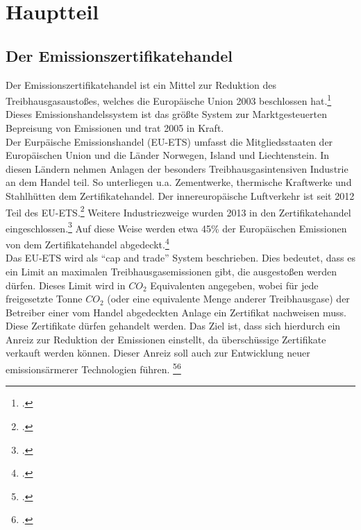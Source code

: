 \chapter{Hauptteil}
\section{Der Emissionszertifikatehandel}
Der Emissionszertifikatehandel ist ein Mittel zur Reduktion des Treibhausgasaustoßes, welches die Europäische Union 2003 beschlossen hat.\footcite[Vgl. auch im Folgenden][]{Buchner2007}
Dieses Emissionshandelssystem ist das größte System zur Marktgesteuerten Bepreisung von Emissionen und trat 2005 in Kraft.\\
Der Eurpäische Emissionshandel (EU-ETS) umfasst die Mitgliedsstaaten der Europäischen Union und die Länder Norwegen, Island und Liechtenstein.
In diesen Ländern nehmen Anlagen der besonders Treibhausgasintensiven Industrie an dem Handel teil.
So unterliegen u.a. Zementwerke, thermische Kraftwerke und Stahlhütten dem Zertifikatehandel. Der innereuropäische Luftverkehr ist seit 2012 Teil des EU-ETS.\footcite[Vgl.][]{Umweltbundesamt}
Weitere Industriezweige wurden 2013 in den Zertifikatehandel eingeschlossen.\footcite[Vgl.][]{Emissionshandelsstelle2015}
Auf diese Weise werden etwa 45\% der Europäischen Emissionen von dem Zertifikatehandel abgedeckt.\footcite[Vgl.][]{Komission}
\\
Das EU-ETS wird als \enquote{cap and trade} System beschrieben.
Dies bedeutet, dass es ein Limit an maximalen Treibhausgasemissionen gibt, die ausgestoßen werden dürfen.
Dieses Limit wird in $CO_2$ Equivalenten angegeben, wobei für jede freigesetzte Tonne $CO_2$ (oder eine equivalente Menge anderer Treibhausgase) der Betreiber einer vom Handel abgedeckten Anlage ein Zertifikat nachweisen muss.
Diese Zertifikate dürfen gehandelt werden.
Das Ziel ist, dass sich hierdurch ein Anreiz zur Reduktion der Emissionen einstellt, da überschüssige Zertifikate verkauft werden können.
Dieser Anreiz soll auch zur Entwicklung neuer emissionsärmerer Technologien führen.
\footcite[Vgl.][]{Umweltbundesamt}\footcite[Vgl.][]{Komission}
